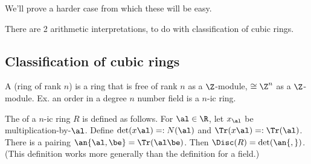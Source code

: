 We'll prove a harder case from which these will be easy.


There are 2 arithmetic interpretations, to do with classification of cubic rings.
\subsection{Classification of cubic rings}

\begin{df}
A  (ring of rank $n$) is a ring that is free of rank $n$ as a $\Z$-module, $\cong \Z^n$ as a $\Z$-module. Ex. an order in a degree $n$ number field is a $n$-ic ring.

The  of a $n$-ic ring $R$ is defined as follows. For $\al \in \R$, let $x_{\al}$ be multiplication-by-$\al$. Define $\det(x\al)=: N(\al)$ and $\Tr(x\al) =:\Tr(\al)$. 
There is a pairing $\an{\al,\be} = \Tr(\al\be)$. Then $\Disc(R)=\det(\an{,})$. (This definition works more generally than the definition for a field.)
\end{df}

